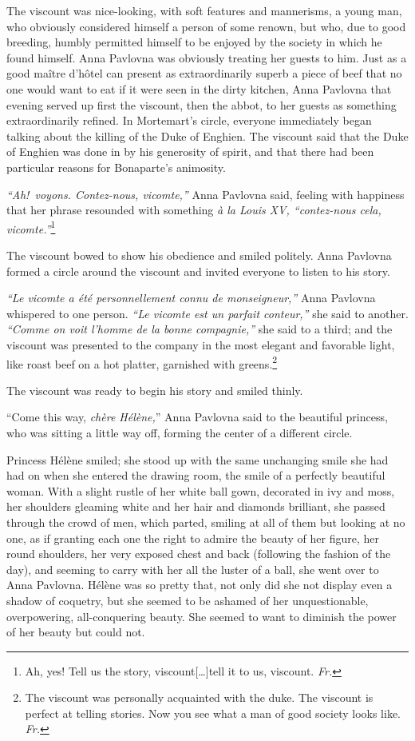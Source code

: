 The viscount was nice-looking, with soft features and mannerisms, a young man, who obviously considered himself a person of some renown, but who, due to good breeding, humbly permitted himself to be enjoyed by the society in which he found himself. Anna Pavlovna was obviously treating her guests to him. Just as a good ma\^itre d'h\^otel can present as extraordinarily superb a piece of beef that no one would want to eat if it were seen in the dirty kitchen, Anna Pavlovna that evening served up first the viscount, then the abbot, to her guests as something extraordinarily refined. In Mortemart's circle, everyone immediately began talking about the killing of the Duke of Enghien. The viscount said that the Duke of Enghien was done in by his generosity of spirit, and that there had been particular reasons for Bonaparte's animosity.

\textit{``Ah!~voyons. Contez-nous, vicomte,''} Anna Pavlovna said, feeling with happiness that her phrase resounded with something \textit{\`a la Louis XV, ``contez-nous cela, vicomte.''}\footnote{Ah, yes! Tell us the story, viscount[\ldots{}]tell it to us, viscount. \textit{Fr.}} %

The viscount bowed to show his obedience and smiled politely. Anna Pavlovna formed a circle around the viscount and invited everyone to listen to his story.

\textit{``Le vicomte a \'et\'e personnellement connu de monseigneur,''} Anna Pavlovna whispered to one person. \textit{``Le vicomte est un parfait conteur,''} she said to another. \textit{``Comme on voit l'homme de la bonne compagnie,''} she said to a third; and the viscount was presented to the company in the most elegant and favorable light, like roast beef on a hot platter, garnished with greens.\footnote{The viscount was personally acquainted with the duke. The viscount is perfect at telling stories. Now you see what a man of good society looks like. \textit{Fr.}} %

The viscount was ready to begin his story and smiled thinly.

``Come this way, \textit{ch\`ere H\'el\`ene,}'' Anna Pavlovna said to the beautiful princess, who was sitting a little way off, forming the center of a different circle. %

Princess H\'el\`ene smiled; she stood up with the same unchanging smile she had had on when she entered the drawing room, the smile of a perfectly beautiful woman. With a slight rustle of her white ball gown, decorated in ivy and moss, her shoulders gleaming white and her hair and diamonds brilliant, she passed through the crowd of men, which parted, smiling at all of them but looking at no one, as if granting each one the right to admire the beauty of her figure, her round shoulders, her very exposed chest and back (following the fashion of the day), and seeming to carry with her all the luster of a ball, she went over to Anna Pavlovna. H\'el\`ene was so pretty that, not only did she not display even a shadow of coquetry, but she seemed to be ashamed of her unquestionable, overpowering, all-conquering beauty. She seemed to want to diminish the power of her beauty but could not.

